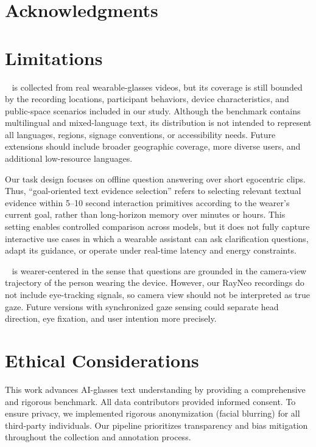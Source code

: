 \documentclass[11pt]{article}
\theoremstyle{plain}
\theoremstyle{definition}
\theoremstyle{remark}
\begin{document}
\section*{Acknowledgments}

\section*{Limitations}

\dataset~ is collected from real wearable-glasses videos, but its coverage is still bounded by the recording locations, participant behaviors, device characteristics, and public-space scenarios included in our study. Although the benchmark contains multilingual and mixed-language text, its distribution is not intended to represent all languages, regions, signage conventions, or accessibility needs. Future extensions should include broader geographic coverage, more diverse users, and additional low-resource languages.

Our task design focuses on offline question answering over short egocentric clips. Thus, ``goal-oriented text evidence selection'' refers to selecting relevant textual evidence within 5--10 second interaction primitives according to the wearer's current goal, rather than long-horizon memory over minutes or hours. This setting enables controlled comparison across models, but it does not fully capture interactive use cases in which a wearable assistant can ask clarification questions, adapt its guidance, or operate under real-time latency and energy constraints.

\dataset~ is wearer-centered in the sense that questions are grounded in the camera-view trajectory of the person wearing the device. However, our RayNeo recordings do not include eye-tracking signals, so camera view should not be interpreted as true gaze. Future versions with synchronized gaze sensing could separate head direction, eye fixation, and user intention more precisely.



\section*{Ethical Considerations}

This work advances AI-glasses text understanding by providing a comprehensive and rigorous benchmark. 
 All data contributors provided informed consent. To ensure privacy, we implemented rigorous anonymization (facial blurring) for all third-party individuals. Our pipeline prioritizes transparency and bias mitigation throughout the collection and annotation process.
\end{document}
